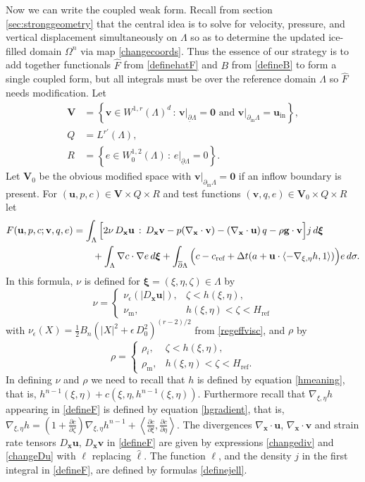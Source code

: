 \documentclass[letterpaper,final,12pt,reqno]{amsart}
\newcommand{\eps}{\epsilon}
\newcommand{\grad}{\nabla}
\newcommand{\bu}{\mathbf{u}}
\newcommand{\bv}{\mathbf{v}}
\newcommand{\bx}{\mathbf{x}}
\newcommand{\bV}{\mathbf{V}}
\newcommand{\bxi}{\bm{\xi}}
\newcommand{\bzero}{\bm{0}}
\newcommand{\cref}{c_{\text{ref}}}
\newcommand{\Href}{H_{\text{ref}}}
\newcommand{\num}{\nu_{\text{m}}}
\newcommand{\rhom}{\rho_{\text{m}}}
\begin{document}
Now we can write the coupled weak form.  Recall from section \ref{sec:stronggeometry} that the central idea is to solve for velocity, pressure, and vertical displacement simultaneously on $\Lambda$ so as to determine the updated ice-filled domain $\Omega^n$ via map \eqref{changecoords}.  Thus the essence of our strategy is to add together functionals $\hat F$ from \eqref{definehatF} and $B$ from \eqref{defineB} to form a single coupled form, but all integrals must be over the reference domain $\Lambda$ so $\hat F$ needs modification.  Let
\begin{align*}
\bV &= \left\{\bv \in W^{1,r}(\Lambda)^d\,:\,\bv\big|_{\underline{\partial} \Lambda}=\bzero \text{ and } \bv\big|_{\partial_{\text{in}} \Lambda} = \bu_{\text{in}}\right\}, \\
Q   &= L^{r'}(\Lambda), \\
R   &= \left\{e \in W_0^{1,2}(\Lambda)\,:\,e\big|_{\underline{\partial} \Lambda} = 0\right\}.
\end{align*}
Let $\bV_0$ be the obvious modified space with $\bv\big|_{\partial_{\text{in}} \Lambda} = \bzero$ if an inflow boundary is present.  For $(\bu,p,c) \in \bV\times Q\times R$ and test functions $(\bv,q,e) \in \bV_0\times Q\times R$ let
\begin{align}
F(\bu,p,c;\bv,q,e) &= \int_{\Lambda} \Big[2 \nu\, D_\bx\bu\,:\,D_\bx\bv - p (\nabla_\bx \cdot \bv) - \left(\nabla_\bx \cdot \bu\right) q - \rho \mathbf{g} \cdot \bv\Big] j \,d\bxi  \notag \\
&\qquad + \int_\Lambda \grad c \cdot \grad e \,d\bxi + \int_{\overline{\partial} \Lambda} \Big(c - \cref + \Delta t(a + \bu\cdot \left<-\grad_{\xi,\eta} h,1\right>)\Big) e\,d\sigma. \label{defineF}
\end{align}
In this formula, $\nu$ is defined for $\bxi=(\xi,\eta,\zeta)\in\Lambda$ by
    $$\nu = \begin{cases} \nu_\eps(|D_\bx\bu|), & \zeta < h(\xi,\eta), \\
                          \num, & h(\xi,\eta) < \zeta < \Href \end{cases}$$
with $\nu_\eps(X) = \frac{1}{2} B_n \left(|X|^2 + \eps\, D_0^2\right)^{(r-2)/2}$ from \eqref{regeffvisc}, and $\rho$ by
    $$\rho = \begin{cases} \rho_i, & \zeta < h(\xi,\eta), \\
                           \rhom, & h(\xi,\eta) < \zeta < \Href. \end{cases}$$
In defining $\nu$ and $\rho$ we need to recall that $h$ is defined by equation \eqref{hmeaning}, that is, $h^{n-1}(\xi,\eta) + c(\xi,\eta,h^{n-1}(\xi,\eta))$.  Furthermore recall that $\grad_{\xi,\eta} h$ appearing in \eqref{defineF} is defined by equation \eqref{hgradient}, that is, $\grad_{\xi,\eta} h = \left(1+\frac{\partial c}{\partial\zeta}\right) \grad_{\xi,\eta} h^{n-1} + \left<\frac{\partial c}{\partial\xi},\frac{\partial c}{\partial\eta}\right>$.  The divergences $\grad_\bx \cdot\bu$, $\grad_\bx \cdot\bv$ and strain rate tensors $D_\bx\bu$, $D_\bx\bv$ in \eqref{defineF} are given by expressions \eqref{changediv} and \eqref{changeDu} with $\ell$ replacing $\hat\ell$.  The function $\ell$, and the density $j$ in the first integral in \eqref{defineF}, are defined by formulas \eqref{definejell}.
\end{document}
